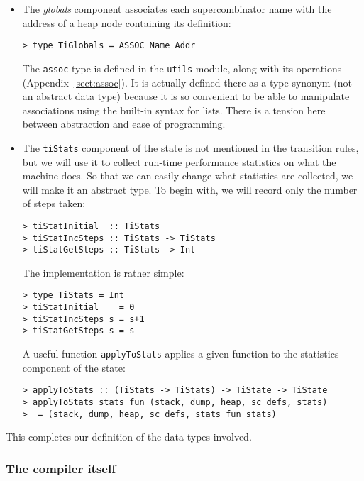\begin{itemize}
\item
The {\em globals\/} component associates each
supercombinator name with
the address of a heap node containing its definition:
\begin{verbatim}
> type TiGlobals = ASSOC Name Addr
\end{verbatim}
%
The \mbox{\tt assoc} type is defined in the \mbox{\tt utils} module, along with its
operations (Appendix~\ref{sect:assoc}).
It is actually defined there as a type synonym (not an abstract
data type) because it is so convenient to be able to manipulate associations
using the built-in syntax for lists.  There is a tension here between
abstraction and ease of programming.

\item
The \mbox{\tt tiStats} component of the state is not mentioned in the
transition rules, but we will use it to collect run-time performance
statistics on what the machine does.
So that we can easily change what statistics are collected,
we will make it an abstract type.  To begin with, we will record only
the number of steps taken:
\begin{verbatim}
> tiStatInitial  :: TiStats
> tiStatIncSteps :: TiStats -> TiStats
> tiStatGetSteps :: TiStats -> Int
\end{verbatim}
%
%
%
The implementation is rather simple:
\begin{verbatim}
> type TiStats = Int
> tiStatInitial    = 0
> tiStatIncSteps s = s+1
> tiStatGetSteps s = s
\end{verbatim}
%
%
%
%
A useful function \mbox{\tt applyToStats} applies a given function to the
statistics
component of the state:
\begin{verbatim}
> applyToStats :: (TiStats -> TiStats) -> TiState -> TiState
> applyToStats stats_fun (stack, dump, heap, sc_defs, stats)
>  = (stack, dump, heap, sc_defs, stats_fun stats)
\end{verbatim}
%
%
\end{itemize}
This completes our definition of the data types involved.

\subsubsection{The compiler itself}
\label{sect:ti:compiler}
\label{sect:mapAccuml-example}


